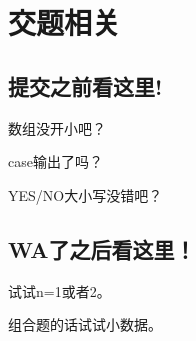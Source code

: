\section{交题相关}

\subsection{提交之前看这里!}

数组没开小吧？

case输出了吗？

YES/NO大小写没错吧？

\subsection{WA了之后看这里！}

试试n=1或者2。

组合题的话试试小数据。
